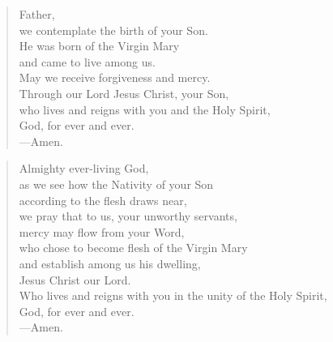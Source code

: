 \prayer

\setlength{\vleftmargin}{\prayerleftmargini}

\begin{verse}
Father,\\
we contemplate the birth of your Son.\\
He was born of the Virgin Mary\\
and came to live among us.\\
May we receive forgiveness and mercy.\\
Through our Lord Jesus Christ, your Son, \\
who lives and reigns with you and the Holy Spirit, \\
God, for ever and ever.\\
{\color{red}---\thinspace}Amen.
\end{verse}


\begin{verse}
Almighty ever-living God,\\
as we see how the Nativity of your Son\\
according to the flesh draws near,\\
we pray that to us, your unworthy servants,\\
mercy may flow from your Word,\\
who chose to become flesh of the Virgin Mary\\
and establish among us his dwelling,\\
Jesus Christ our Lord.\\
Who lives and reigns with you in the unity of the Holy Spirit,\\
God, for ever and ever.\\
{\color{red}---\thinspace}Amen.

\end{verse}

\setlength{\vleftmargin}{\defleftmargini}